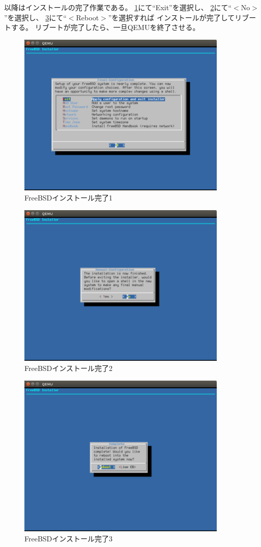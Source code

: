 \documentclass[a4j]{jarticle}
\begin{document}
以降はインストールの完了作業である。
\ref{fig:FreeBSD_FIN_1}にて``Exit''を選択し、
\ref{fig:FreeBSD_FIN_2}にて``$<$No$>$''を選択し、
\ref{fig:FreeBSD_FIN_3}にて``$<$Reboot$>$''を選択すれば
インストールが完了してリブートする。
リブートが完了したら、一旦QEMUを終了させる。
\begin{figure}[htbp]
	\centering
	\includegraphics[width=10cm]{./IMG/FreeBSD_FIN.png}
    \caption{FreeBSDインストール完了1}
    \label{fig:FreeBSD_FIN_1}
\end{figure}
\begin{figure}[htbp]
	\centering
	\includegraphics[width=10cm]{./IMG/FreeBSD_LST.png}
    \caption{FreeBSDインストール完了2}
    \label{fig:FreeBSD_FIN_2}
\end{figure}
\begin{figure}[htbp]
	\centering
	\includegraphics[width=10cm]{./IMG/FreeBSD_ALL_LAS.png}
    \caption{FreeBSDインストール完了3}
    \label{fig:FreeBSD_FIN_3}
\end{figure}
\end{document}
